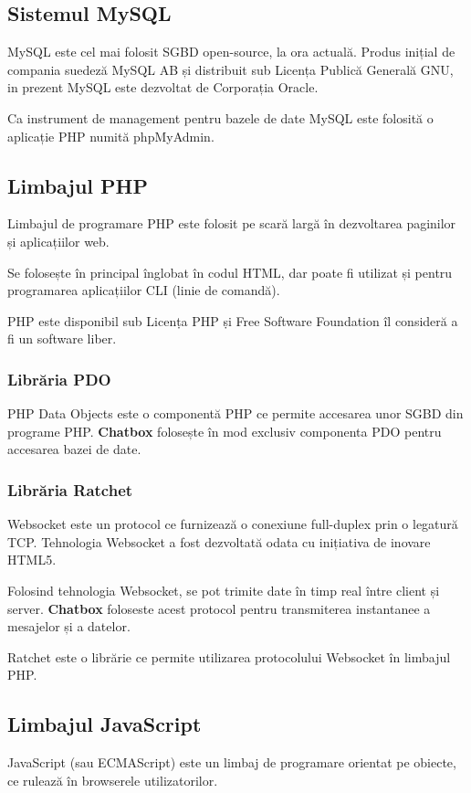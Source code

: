 \documentclass[12pt,a4paper]{article}
\begin{document}
\subsection{Sistemul MySQL}
MySQL\cite{mysql} este cel mai folosit SGBD\citep{sgbd} open-source, 
la ora actuală. Produs inițial de compania suedeză MySQL AB 
și distribuit sub Licența Publică Generală GNU\cite{free}, 
in prezent MySQL este dezvoltat
de Corporația Oracle.

Ca instrument de management pentru bazele de date MySQL
este folosită o aplicație PHP numită phpMyAdmin.

\subsection{Limbajul PHP}
Limbajul de programare PHP\citep{php} este folosit pe scară largă 
în dezvoltarea paginilor și aplicațiilor web.

Se folosește în principal înglobat în codul HTML, dar poate fi 
utilizat și pentru programarea aplicațiilor CLI (linie de comandă).

PHP este disponibil sub Licenṭa PHP ṣi Free Software Foundation 
îl consideră a fi un software liber\citep{free}.

\subsubsection{Librăria PDO}
PHP Data Objects\citep{pdo} este o componentă PHP ce permite accesarea unor SGBD din
programe PHP. \textbf{Chatbox} folosește  în mod exclusiv componenta PDO pentru 
accesarea bazei de date. 

\subsubsection{Librăria Ratchet}
Websocket\citep{websocket} este un protocol ce furnizează o conexiune full-duplex prin o legatură TCP. Tehnologia Websocket a fost dezvoltată odata cu inițiativa de 
inovare HTML5. 

Folosind tehnologia Websocket, se pot trimite date în timp real între 
client și server. \textbf{Chatbox} foloseste acest protocol pentru
transmiterea instantanee a mesajelor și a datelor.

Ratchet\citep{ratchet} este o librărie ce permite utilizarea protocolului 
Websocket în limbajul PHP.

\subsection{Limbajul JavaScript}
JavaScript (sau ECMAScript) este un limbaj de programare orientat pe obiecte\citep{javascript}, ce rulează  în browserele utilizatorilor. 
\end{document}
